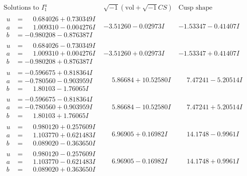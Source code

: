 \documentclass[1p]{elsarticle_modified}
\theoremstyle{definition}
\newcommand{\I}{\sqrt{-1}}
\begin{document}
$$\begin{array}{c|c|c}  
\text{Solutions to }I^u_{1}& \I (\text{vol} + \sqrt{-1}CS) & \text{Cusp shape}\\
 \hline 
\begin{aligned}
u &= \phantom{-}0.684026 + 0.730349 I \\
a &= \phantom{-}1.009310 - 0.004276 I \\
b &= -0.980208 - 0.876387 I\end{aligned}
 & -3.51260 - 0.02973 I & -1.53347 - 0.41407 I \\ \hline\begin{aligned}
u &= \phantom{-}0.684026 - 0.730349 I \\
a &= \phantom{-}1.009310 + 0.004276 I \\
b &= -0.980208 + 0.876387 I\end{aligned}
 & -3.51260 + 0.02973 I & -1.53347 + 0.41407 I \\ \hline\begin{aligned}
u &= -0.596675 + 0.818364 I \\
a &= -0.780560 - 0.903959 I \\
b &= \phantom{-}1.80103 - 1.76065 I\end{aligned}
 & \phantom{-}5.86684 + 10.52580 I & \phantom{-}7.47241 - 5.20514 I \\ \hline\begin{aligned}
u &= -0.596675 - 0.818364 I \\
a &= -0.780560 + 0.903959 I \\
b &= \phantom{-}1.80103 + 1.76065 I\end{aligned}
 & \phantom{-}5.86684 - 10.52580 I & \phantom{-}7.47241 + 5.20514 I \\ \hline\begin{aligned}
u &= \phantom{-}0.980120 + 0.257609 I \\
a &= \phantom{-}1.103770 + 0.621483 I \\
b &= \phantom{-}0.089020 - 0.363650 I\end{aligned}
 & \phantom{-}6.96905 + 0.16982 I & \phantom{-}14.1748 - 0.9961 I \\ \hline\begin{aligned}
u &= \phantom{-}0.980120 - 0.257609 I \\
a &= \phantom{-}1.103770 - 0.621483 I \\
b &= \phantom{-}0.089020 + 0.363650 I\end{aligned}
 & \phantom{-}6.96905 - 0.16982 I & \phantom{-}14.1748 + 0.9961 I \\ \hline\begin{aligned}

\end{aligned}
\end{array}$$
\end{document}

